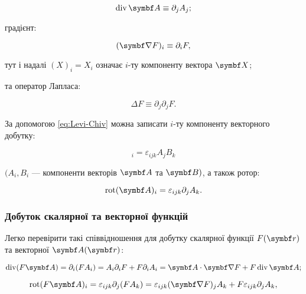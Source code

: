 \begin{equation*}
\Div \vect{A} \equiv \partial_j A_j;
\end{equation*}

градієнт:

\begin{equation*}
(\grad F)_i \equiv \partial_i F,
\end{equation*}

тут і надалі \((X)_i = X_i\) означає \(i\)-ту компоненту вектора \(\vect{X}\);

та оператор Лапласа:

\begin{equation*}
\Delta F \equiv \partial_j \partial_j F.
\end{equation*}



За допомогою \eqref{eq:Levi-Chiv} можна записати \(i\)-ту компоненту векторного добутку:

\begin{equation*}
[\vect{A} \times \vect{B}]_i = \varepsilon_{ijk} A_j B_k
\end{equation*}

\((A_i, B_i\) --- компоненти векторів \(\vect{A}\) та \(\vect{B})\), а також ротор:

\begin{equation*}
\Rot(\vect{A})_i = \varepsilon_{ijk} \partial_j A_k.
\end{equation*}

\subsubsection{Добуток скалярної та векторної функцій}

Легко перевірити такі співвідношення для добутку скалярної функції \( F(\vect{r}) \) та векторної \( \vect{A}(\vect{r}) \):

\begin{equation*}
\Div(F \vect{A}) = \partial_i (F A_i) = A_i \partial_i F + F \partial_i A_i = \vect{A} \cdot \grad F + F \Div \vect{A};
\end{equation*}

\begin{equation*}
\Rot(F \vect{A})_i = \varepsilon_{ijk} \partial_j (F A_k) = \varepsilon_{ijk} (\grad F)_j A_k + F \varepsilon_{ijk} \partial_j A_k,
\end{equation*}

